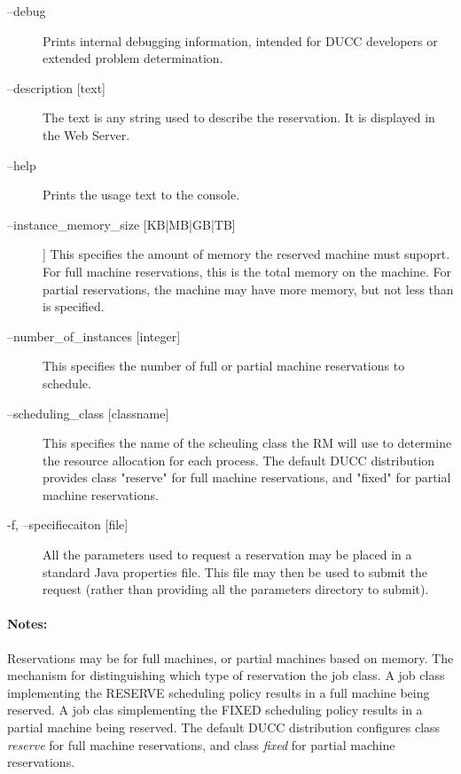         \begin{description}

            \item[--debug ]          
              Prints internal debugging information, intended for DUCC developers or extended problem determination.
              
            \item[--description {[text]}]               
              The text is any string used to describe the reservation. It is displayed in the Web Server. 
              
            \item[--help ]             
              Prints the usage text to the console. 
                            
            \item[--instance\_memory\_size {[KB|MB|GB|TB]}]]               
              This specifies the amount of memory the reserved machine must supoprt. For full machine 
              reservations, this is the total memory on the machine. For partial reservations, the machine 
              may have more memory, but not less than is specified. 

            \item[--number\_of\_instances {[integer]}]               
              This specifies the number of full or partial machine reservations to schedule. 
                            
            \item[--scheduling\_class {[classname]}]               
              This specifies the name of the scheuling class the RM will use to determine the resource 
              allocation for each process. The default DUCC distribution provides class "reserve" for full 
              machine reservations, and "fixed" for partial machine reservations. 
              
            \item[-f, --specifiecaiton {[file]}]               
              All the parameters used to request a reservation may be placed in a standard Java 
              properties file. This file may then be used to submit the request (rather than providing all 
              the parameters directory to submit). 

        \end{description}
            
    \paragraph{Notes:}
    Reservations may be for full machines, or partial machines based on memory. The mechanism for
    distinguishing which type of reservation the job class. A job class implementing the RESERVE
    scheduling policy results in a full machine being reserved. A job clas simplementing the FIXED
    scheduling policy results in a partial machine being reserved. The default DUCC distribution
    configures class {\em reserve} for full machine reservations, and class {\em fixed} for partial
    machine reservations.


